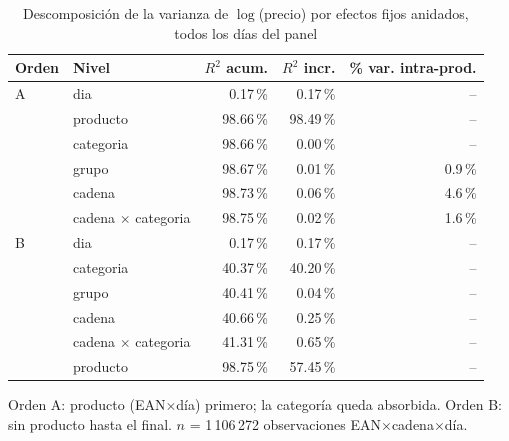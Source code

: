 \begin{table}[htbp]
\caption{Descomposici\'on de la varianza de $\log$(precio) por efectos fijos anidados, todos los d\'ias del panel}
\label{tab:varianza}
\centering\scriptsize\setlength{\tabcolsep}{3pt}
\begin{tabular}{@{}llrrr@{}}
\toprule
Orden & Nivel & $R^2$ acum. & $R^2$ incr. & \% var. intra-prod. \\
\midrule
A & dia & 0.17\,\% & 0.17\,\% & -- \\
 & producto & 98.66\,\% & 98.49\,\% & -- \\
 & categoria & 98.66\,\% & 0.00\,\% & -- \\
 & grupo & 98.67\,\% & 0.01\,\% & 0.9\,\% \\
 & cadena & 98.73\,\% & 0.06\,\% & 4.6\,\% \\
 & cadena $\times$ categoria & 98.75\,\% & 0.02\,\% & 1.6\,\% \\
\midrule
B & dia & 0.17\,\% & 0.17\,\% & -- \\
 & categoria & 40.37\,\% & 40.20\,\% & -- \\
 & grupo & 40.41\,\% & 0.04\,\% & -- \\
 & cadena & 40.66\,\% & 0.25\,\% & -- \\
 & cadena $\times$ categoria & 41.31\,\% & 0.65\,\% & -- \\
 & producto & 98.75\,\% & 57.45\,\% & -- \\
\bottomrule\end{tabular}
\par\smallskip\raggedright\scriptsize Orden A: producto (EAN$\times$d\'ia) primero; la categor\'ia queda absorbida. Orden B: sin producto hasta el final. $n$ = 1\,106\,272 observaciones EAN$\times$cadena$\times$d\'ia.
\end{table}
